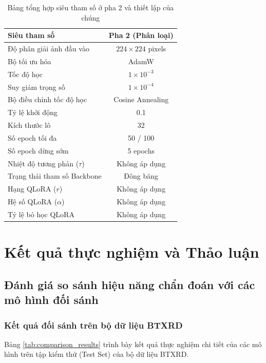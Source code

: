 \begin{table}[htbp]
\centering
\begin{tabular}{|l|c|}
\hline
\textbf{Siêu tham số}        & \textbf{Pha 2 (Phân loại)} \\ \hline
Độ phân giải ảnh đầu vào     & $224 \times 224$ pixels    \\ \hline
Bộ tối ưu hóa                & AdamW                      \\ \hline
Tốc độ học                  & $1 \times 10^{-3}$          \\ \hline
Suy giảm trọng số            & $1 \times 10^{-4}$         \\ \hline
Bộ điều chỉnh tốc độ học     & Cosine Annealing           \\ \hline
Tỷ lệ khởi động              & 0.1                        \\ \hline
Kích thước lô                & 32                         \\ \hline
Số epoch tối đa              & 50 / 100                   \\ \hline
Số epoch dừng sớm           & 5 epochs                    \\ \hline
Nhiệt độ tương phản ($\tau$) & Không áp dụng              \\ \hline
Trạng thái tham số Backbone & Đông băng                   \\ \hline
Hạng QLoRA ($r$)             & Không áp dụng              \\ \hline
Hệ số QLoRA ($\alpha$)       & Không áp dụng              \\ \hline
Tỷ lệ bỏ học QLoRA           & Không áp dụng              \\ \hline
\end{tabular}
\caption{Bảng tổng hợp siêu tham số ở pha 2 và thiết lập của chúng}
\label{tab:hyperparameters_phase2}
\end{table}

\section{Kết quả thực nghiệm và Thảo luận}

\subsection{Đánh giá so sánh hiệu năng chẩn đoán với các mô hình đối sánh}
\subsubsection{Kết quả đối sánh trên bộ dữ liệu BTXRD}
Bảng \ref{tab:comparison_results} trình bày kết quả thực nghiệm chi tiết của các mô hình trên tập kiểm thử (Test Set) của bộ dữ liệu BTXRD.

